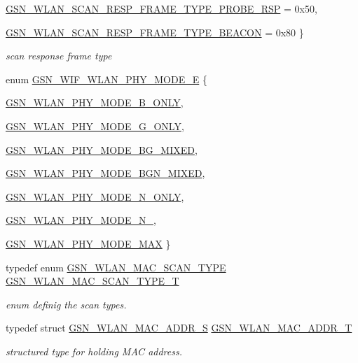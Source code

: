 \begin{DoxyCompactItemize}
\hyperlink{a00641_gga3f0acfab3987e81164e864f7186c7187a770294a815837fe9c2dc6bde4b3d4dd2}{GSN\_\-WLAN\_\-SCAN\_\-RESP\_\-FRAME\_\-TYPE\_\-PROBE\_\-RSP} =  0x50, 
\par
\hyperlink{a00641_gga3f0acfab3987e81164e864f7186c7187a367086e0b187f766c247e036f4791cac}{GSN\_\-WLAN\_\-SCAN\_\-RESP\_\-FRAME\_\-TYPE\_\-BEACON} =  0x80
 \}
\begin{DoxyCompactList}\small\item\em scan response frame type \end{DoxyCompactList}\item 
enum \hyperlink{a00641_ga9150700f5a8033a0c34dba0d69e2ff38}{GSN\_\-WIF\_\-WLAN\_\-PHY\_\-MODE\_\-E} \{ \par
\hyperlink{a00641_ga9150700f5a8033a0c34dba0d69e2ff38a9258d0f7cded17bc5ab41dd8257f3700}{GSN\_\-WLAN\_\-PHY\_\-MODE\_\-B\_\-ONLY}, 
\par
\hyperlink{a00641_ga9150700f5a8033a0c34dba0d69e2ff38a1a7b120674a9ec20783b762dedc89a88}{GSN\_\-WLAN\_\-PHY\_\-MODE\_\-G\_\-ONLY}, 
\par
\hyperlink{a00641_ga9150700f5a8033a0c34dba0d69e2ff38ae6b5f2dd183f21b571117e253f8d3a5f}{GSN\_\-WLAN\_\-PHY\_\-MODE\_\-BG\_\-MIXED}, 
\par
\hyperlink{a00641_ga9150700f5a8033a0c34dba0d69e2ff38a7d1e257501850ebbe688e222ae2ffcb0}{GSN\_\-WLAN\_\-PHY\_\-MODE\_\-BGN\_\-MIXED}, 
\par
\hyperlink{a00641_ga9150700f5a8033a0c34dba0d69e2ff38a62ad918b30aad8dec0a843c4776e568f}{GSN\_\-WLAN\_\-PHY\_\-MODE\_\-N\_\-ONLY}, 
\par
\hyperlink{a00641_ga9150700f5a8033a0c34dba0d69e2ff38a6b517b7ed73031d71230816e95cbdf5c}{GSN\_\-WLAN\_\-PHY\_\-MODE\_\-N\_}, 
\par
\hyperlink{a00641_ga9150700f5a8033a0c34dba0d69e2ff38a350412525ef42f390e738696528ab4ed}{GSN\_\-WLAN\_\-PHY\_\-MODE\_\-MAX}
 \}
\item 
typedef enum \hyperlink{a00641_ga52dec04a012aa9893ac84e96062c470b}{GSN\_\-WLAN\_\-MAC\_\-SCAN\_\-TYPE} \hyperlink{a00641_gab674354b3ef30f1389f12adc7d3e887e}{GSN\_\-WLAN\_\-MAC\_\-SCAN\_\-TYPE\_\-T}
\begin{DoxyCompactList}\small\item\em enum definig the scan types. \end{DoxyCompactList}\item 
typedef struct \hyperlink{a00416}{GSN\_\-WLAN\_\-MAC\_\-ADDR\_\-S} \hyperlink{a00641_gabf7f5cc6656c9288e5d56c8aeafc8477}{GSN\_\-WLAN\_\-MAC\_\-ADDR\_\-T}
\begin{DoxyCompactList}\small\item\em structured type for holding MAC address. \end{DoxyCompactList}\item 

\end{DoxyCompactItemize}
